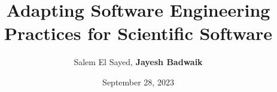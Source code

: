 \title{Adapting Software Engineering Practices for Scientific Software}
\author[\textbf{Jayesh Badwaik}]{{Salem El Sayed, \textbf{Jayesh Badwaik}}
 }
\date{September 28, 2023}
